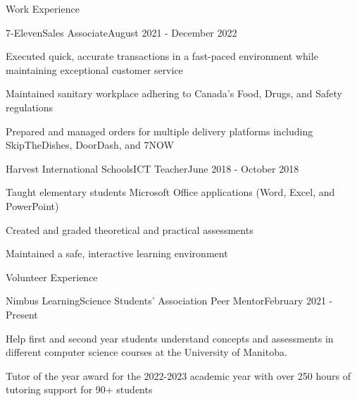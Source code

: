 \documentclass{article}
\newlength{\tabin}
\newlength{\secsep}
\newcommand{\lineunder}{\vspace*{-8pt} \\ \hspace*{-6pt} \hrulefill \\ \vspace*{-15pt}}
\newenvironment{tabbedsection}[1]{
	\begin{list}{}{
		\setlength{\itemsep}{0pt}
		\setlength{\labelsep}{0pt}
		\setlength{\labelwidth}{0pt}
		\setlength{\leftmargin}{\tabin}
		\setlength{\rightmargin}{\tabin}
		\setlength{\listparindent}{0pt}
		\setlength{\parsep}{0pt}
		\setlength{\parskip}{0pt}
		\setlength{\partopsep}{0pt}
		\setlength{\topsep}{#1}
	}
		\item[]
		}{
	\end{list}}
\newenvironment{resume_section}[1]{
	\vspace{2\secsep}
	\textsc{\large#1}
	\lineunder
	\begin{tabbedsection}{\secsep}
	}{\end{tabbedsection}}
\newenvironment{subitems}{
	\renewcommand{\labelitemi}{-}
	\begin{itemize}
		\setlength{\labelsep}{1em}
		}{
	\end{itemize}}
\newenvironment{resume_employer}[4]{
	\vspace{\secsep}
	\begin{minipage}[t]{0.75\linewidth}
		\textbf{#1}\\
		\small #2
	\end{minipage}%
	\begin{minipage}[t]{0.25\linewidth}
		\hfill \footnotesize #4
	\end{minipage}
	\vspace{0.1em}\\
	\begin{tabbedsection}{0pt}
		\begin{subitems}
		}{\end{subitems}
	\end{tabbedsection}}
\begin{document}
\begin{resume_section}{Work Experience}
		
		\begin{resume_employer}{7-Eleven}{Sales Associate}{}{August 2021 - December 2022}
			\item Executed quick, accurate transactions in a fast-paced environment while maintaining exceptional customer service
			\item Maintained sanitary workplace adhering to Canada's Food, Drugs, and Safety regulations
			\item Prepared and managed orders for multiple delivery platforms including SkipTheDishes, DoorDash, and 7NOW
		\end{resume_employer}
		
		\begin{resume_employer}{Harvest International Schools}{ICT Teacher}{}{June 2018 - October 2018}
			\item Taught elementary students Microsoft Office applications (Word, Excel, and PowerPoint)
			\item Created and graded theoretical and practical assessments
			\item Maintained a safe, interactive learning environment
		\end{resume_employer}
	\end{resume_section}
	
	
	\begin{resume_section}{Volunteer Experience}
		\begin{resume_employer}{Nimbus Learning}{Science Students' Association Peer Mentor}{}{February 2021 - Present}
			\item Help first and second year students understand concepts and assessments in different computer
			science courses at the University of Manitoba.
			\item Tutor of the year award for the 2022-2023 academic year with over 250 hours of tutoring support for 90+ students
		\end{resume_employer}
		
	\end{resume_section}
	
\end{document}
